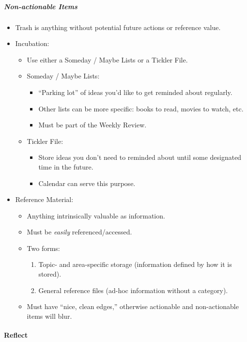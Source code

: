 \documentclass{article}
\begin{document}
\subparagraph{Non-actionable Items}

\begin{itemize}
  \item Trash is anything without potential future actions or reference value.
  \item Incubation:
  \begin{itemize}
    \item Use either a Someday / Maybe Lists or a Tickler File.
    \item Someday / Maybe Lists:
    \begin{itemize}
      \item ``Parking lot'' of ideas you'd like to get reminded about regularly.
      \item Other lists can be more specific: books to read, movies to watch, etc.
      \item Must be part of the Weekly Review.
    \end{itemize}
    \item Tickler File:
    \begin{itemize}
      \item Store ideas you don't need to reminded about until some designated time in the future.
      \item Calendar can serve this purpose.
    \end{itemize}
  \end{itemize}
  \item Reference Material:
  \begin{itemize}
    \item Anything intrinsically valuable as information.
    \item Must be \emph{easily} referenced/accessed.
    \item Two forms:
    \begin{enumerate}
        \item Topic- and area-specific storage (information defined by how it is stored).
        \item General reference files (ad-hoc information without a category).
    \end{enumerate}
    \item Must have ``nice, clean edges,'' otherwise actionable and non-actionable items will blur.
  \end{itemize}
\end{itemize}

\paragraph{Reflect}
\end{document}
